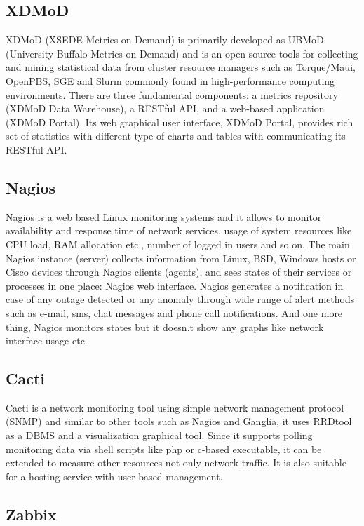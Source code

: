 \documentclass{sig-alternate-05-2015}
\begin{document}
\subsection{XDMoD}

XDMoD (XSEDE Metrics on Demand) is primarily developed as UBMoD (University Buffalo Metrics on Demand) and is an open source tools for collecting and mining statistical data from cluster resource managers such as Torque/Maui, OpenPBS, SGE and Slurm commonly found in high-performance computing environments. There are three fundamental components: a metrics repository (XDMoD Data Warehouse), a RESTful API, and a web-based application (XDMoD Portal). Its web graphical user interface, XDMoD Portal, provides rich set of statistics with different type of charts and tables with communicating its RESTful API.~\cite{CPE:CPE2871,Furlani:2013:UXF:2484762.2484763}

\subsection{Nagios}

Nagios is a web based Linux monitoring systems and it allows to monitor availability and response time of network services, usage of system resources like CPU load, RAM allocation etc., number of logged in users and so on. The main Nagios instance (server) collects information from Linux, BSD, Windows hosts or Cisco devices through Nagios clients (agents), and sees states of their services or processes in one place: Nagios web interface. Nagios generates a notification in case of any outage detected or any anomaly through wide range of alert methods such as e-mail, sms, chat messages and phone call notifications. And one more thing, Nagios monitors states but it doesn.t show any graphs like network interface usage etc.

\subsection{Cacti}
Cacti is a network monitoring tool using simple network management protocol (SNMP) and similar to other tools such as Nagios and Ganglia, it uses RRDtool as a DBMS and a visualization graphical tool. Since it supports polling monitoring data via shell scripts like php or c-based executable, it can be extended to measure other resources not only network traffic. It is also suitable for a hosting service with user-based management.

\subsection{Zabbix}
\end{document}
